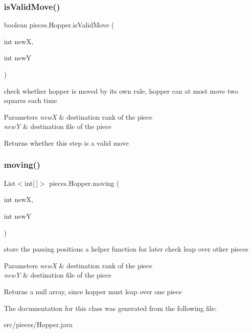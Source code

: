\subsubsection{\texorpdfstring{is\+Valid\+Move()}{isValidMove()}}
{\footnotesize\ttfamily boolean pieces.\+Hopper.\+is\+Valid\+Move (\begin{DoxyParamCaption}\item[{int}]{newX,  }\item[{int}]{newY }\end{DoxyParamCaption})\hspace{0.3cm}{\ttfamily [inline]}}

check whether hopper is moved by its own rule, hopper can at most move two squares each time 
\begin{DoxyParams}{Parameters}
{\em newX} & destination rank of the piece \\
\hline
{\em newY} & destination file of the piece \\
\hline
\end{DoxyParams}
\begin{DoxyReturn}{Returns}
whether this step is a valid move 
\end{DoxyReturn}
\mbox{\label{classpieces_1_1_hopper_a9cb2384553aded22be588ae1eff76d09}} 
\subsubsection{\texorpdfstring{moving()}{moving()}}
{\footnotesize\ttfamily List$<$int\mbox{[}$\,$\mbox{]}$>$ pieces.\+Hopper.\+moving (\begin{DoxyParamCaption}\item[{int}]{newX,  }\item[{int}]{newY }\end{DoxyParamCaption})\hspace{0.3cm}{\ttfamily [inline]}}

store the passing positions a helper function for later check leap over other pieces 
\begin{DoxyParams}{Parameters}
{\em newX} & destination rank of the piece \\
\hline
{\em newY} & destination file of the piece \\
\hline
\end{DoxyParams}
\begin{DoxyReturn}{Returns}
a null array, since hopper must leap over one piece 
\end{DoxyReturn}


The documentation for this class was generated from the following file\+:\begin{DoxyCompactItemize}
\item 
src/pieces/Hopper.\+java\end{DoxyCompactItemize}
